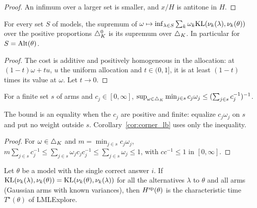 \begin{proof}
  \leanok
  An infimum over a larger set is smaller, and $x / H$ is antitone in $H$.
\end{proof}

\begin{lemma}
  \label{lem:iSup_open_simplex}
  \leanok
  For every set $S$ of models, the supremum of $\omega \mapsto \inf_{\lambda \in S} \sum_k
  \omega_k \mathrm{KL}(\nu_k(\lambda), \nu_k(\theta))$ over the positive proportions $\triangle_K^0$ is its
  supremum over $\triangle_K$. In particular for $S = \mathrm{Alt}(\theta)$.
\end{lemma}

\begin{proof}
  \leanok
  The cost is additive and positively homogeneous in the allocation: at $(1 - t) \omega + t u$, $u$
  the uniform allocation and $t \in (0, 1]$, it is at least $(1 - t)$ times its value at $\omega$.
  Let $t \to 0$.
\end{proof}

\begin{lemma}
  \label{lem:iSup_iInf_mul}
  \leanok
  For a finite set $s$ of arms and $c_j \in [0, \infty]$,
  $\sup_{\omega \in \triangle_K} \min_{j \in s} c_j \omega_j \le (\sum_{j \in s} c_j^{-1})^{-1}$.
\end{lemma}

The bound is an equality when the $c_j$ are positive and finite: equalize $c_j \omega_j$ on $s$
and put no weight outside $s$. Corollary~\ref{cor:corner_lb} uses only the inequality.

\begin{proof}
  \leanok
  For $\omega \in \triangle_K$ and $m = \min_{j \in s} c_j \omega_j$,
  $m \sum_{j \in s} c_j^{-1} \le \sum_{j \in s} \omega_j c_j c_j^{-1} \le \sum_{j \in s} \omega_j
  \le 1$, with $c c^{-1} \le 1$ in $[0, \infty]$.
\end{proof}

\begin{lemma}
  \label{lem:staticDifficulty_eq_charTime}
  \leanok
  Let $\theta$ be a model with the single correct answer $i$. If $\mathrm{KL}(\nu_k(\lambda),
  \nu_k(\theta)) = \mathrm{KL}(\nu_k(\theta), \nu_k(\lambda))$ for all the alternatives $\lambda$ to
  $\theta$ and all arms (Gaussian arms with known variances), then $H^{\mathrm{sp}}(\theta)$ is the
  characteristic time $T^{\star}(\theta)$ of LMLExplore.
\end{lemma}

